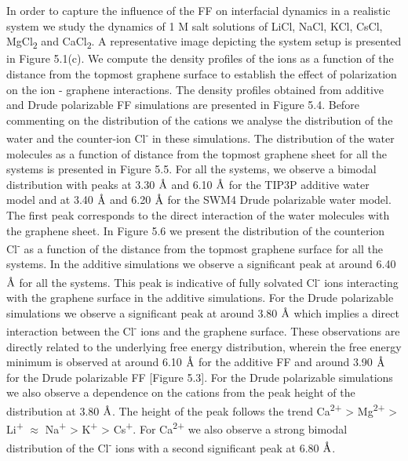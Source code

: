 In order to capture the influence of the FF on interfacial dynamics in a realistic system we study the dynamics of 1 M salt solutions of LiCl, NaCl, KCl, CsCl, MgCl\textsubscript{2} and CaCl\textsubscript{2}. A representative image depicting the system setup is presented in Figure 5.1(c). We compute the density profiles of the ions as a function of the distance from the topmost graphene surface to establish the effect of polarization on the ion - graphene interactions. The density profiles obtained from additive and Drude polarizable FF simulations are presented in Figure 5.4. Before commenting on the distribution of the cations we analyse the distribution of the water and the counter-ion Cl\textsuperscript{-} in these simulations. The distribution of the water molecules as a function of distance from the topmost graphene sheet for all the systems is presented in Figure 5.5.  For all the systems, we observe a bimodal distribution with peaks at 3.30 $\text{\normalfont\AA}$ and 6.10 $\text{\normalfont\AA}$ for the TIP3P additive water model and at 3.40 $\text{\normalfont\AA}$ and 6.20 $\text{\normalfont\AA}$ for the SWM4 Drude polarizable water model.  The first peak corresponds to the direct interaction of the water molecules with the graphene sheet. In Figure 5.6 we present the distribution of the counterion Cl\textsuperscript{-} as a function of the distance from the topmost graphene surface for all the systems. In the additive simulations we observe a significant peak at around 6.40 $\text{\normalfont\AA}$ for all the systems. This peak is indicative of fully solvated Cl\textsuperscript{-} ions interacting with the graphene surface in the additive simulations. For the Drude polarizable simulations we observe a significant peak at around 3.80 $\text{\normalfont\AA}$ which implies a direct interaction between the Cl\textsuperscript{-} ions and the graphene surface. These observations are directly related to the underlying free energy distribution, wherein the free energy minimum is observed at around 6.10 $\text{\normalfont\AA}$ for the additive FF and around 3.90 $\text{\normalfont\AA}$ for the Drude polarizable FF [Figure 5.3]. For the Drude polarizable simulations we also observe a dependence on the cations from the peak height of the distribution at 3.80 $\text{\normalfont\AA}$. The height of the peak follows the trend Ca\textsuperscript{2+} > Mg\textsuperscript{2+} > Li\textsuperscript{+} $\approx$ Na\textsuperscript{+} > K\textsuperscript{+} > Cs\textsuperscript{+}. For Ca\textsuperscript{2+} we also observe a strong bimodal distribution of the Cl\textsuperscript{-} ions with a second significant peak at 6.80 $\text{\normalfont\AA}$.

